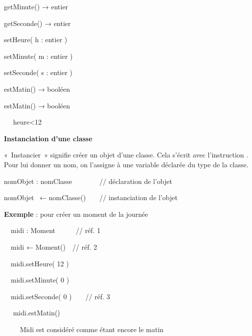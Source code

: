 {\sffamily
{} getMinute() → entier}

{\sffamily
{} getSeconde() → entier}

{\sffamily
{} setHeure( h : entier )}

{\sffamily
{} setMinute( m : entier )}

{\sffamily
{} setSeconde( s : entier )}

{\sffamily
{} estMatin() → booléen}

{\sffamily
{}\textbf{ }}

{\sffamily
{} estMatin() → booléen}

{\sffamily
\ \  heure{\textless}12}

{\sffamily
{}\textbf{ }}

{\sffamily
{}}

{\sffamily\bfseries\upshape
Instanciation d'une classe}

{
«~Instancier~» signifie créer un objet d'une classe.
Cela s'écrit avec l'instruction
. Pour lui donner un nom, on
l'assigne à une variable déclarée du type de la
classe.}

{\sffamily
nomObjet : nomClasse\ \ \ \ \ \ \ \ // déclaration de
l'objet}

{\sffamily
nomObjet \ ←  nomClasse()\ \ \ \ //
instanciation de l'objet}

{
\textbf{Exemple} : pour créer un moment de la journée}

{\sffamily
{}}

{\sffamily
\ \ midi : Moment\ \ \ \ \ \ // réf. 1}

{\sffamily
{\ \ }midi ← 
Moment()\ \ // réf. 2}

{\sffamily
\ \ {midi.setHeure( 12 )}}

{\sffamily
\ \ midi.setMinute( 0 )}

{\sffamily
\ \ midi.setSeconde( 0 )\ \ \ \ // réf. 3}

{\sffamily
{\ \ } midi.estMatin()
}

{\sffamily
\ \ \ \  {\textquotedbl}Midi est considéré comme
étant encore le matin{\textquotedbl}}

